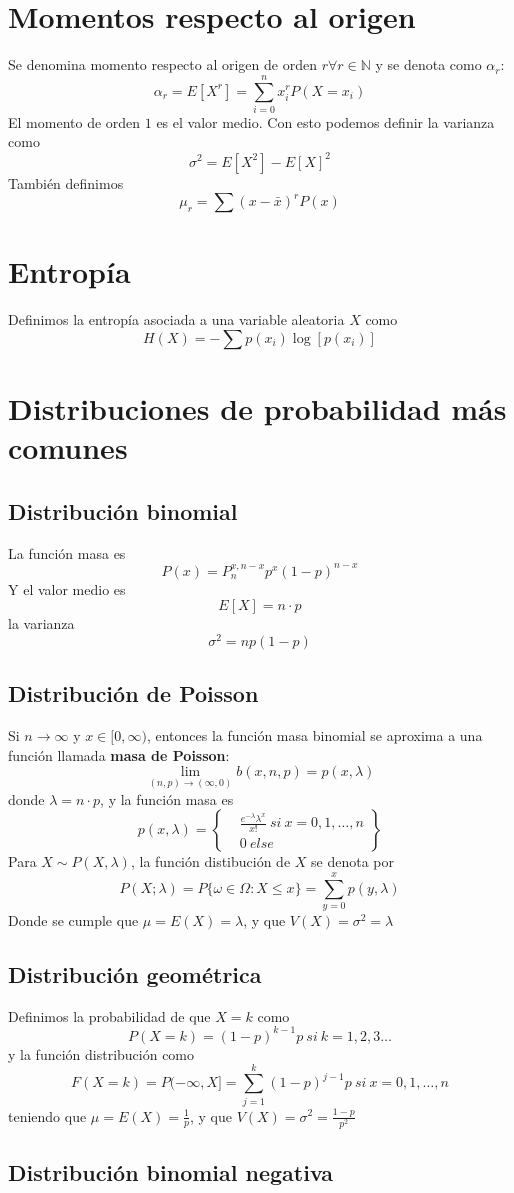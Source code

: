 \documentclass{./Probabilidad.tex}
\begin{document}
\section{Momentos respecto al origen}
Se denomina momento respecto al origen de orden $r \forall r \in \mathbb{N}$ y se denota como $\alpha_{r}$:
$$
\alpha_{r}=E[X^{r}] = \sum_{i=0}^{n} x_{i}^{r}P(X=x_{i})
$$
El momento de orden $1$ es el valor medio. Con esto podemos definir la varianza como
$$
\sigma^{2}=E[X^{2}]-E[X]^{2}
$$
También definimos
$$
\mu_{r} = \sum(x-\bar{x})^rP(x)
$$
\section{Entropía}
Definimos la entropía asociada a una variable aleatoria $X$ como
$$
H(X)= -\sum p(x_{i}) \log[p(x_{i})]
$$
\section{Distribuciones de probabilidad más comunes}
\subsection{Distribución binomial}
La función masa es
\[
	P(x) = P_{n}^{x,n-x}p^{x}(1-p)^{n-x}
\]
Y el valor medio es
\[
	E[X] = n\cdot p
\]
la varianza
\[
	\sigma ^{2}= np(1-p)
\]
\subsection{Distribución de Poisson}
Si $n \to \infty$ y $x \in [0, \infty)$, entonces la función masa binomial se aproxima a una función llamada \textbf{masa de Poisson}:
\[
	\lim_{(n,p) \to (\infty,0)} b(x,n,p)=p(x,\lambda) 
\]
donde $\lambda = n\cdot p$, y la función masa es
\[
	p(x,\lambda) = \left\{
		\begin{matrix}
			&\frac{e^{-\lambda} \lambda^{x}}{x!}~si~x=0,1,\dots ,n\\
			&0~else
	\end{matrix}\right\}
\]
Para $X\sim P(X,\lambda)$, la función distibución de $X$ se denota por
\[
	P(X;\lambda)=P \{ \omega \in \Omega : X \leq x\} = \sum_{y=0}^{x} p(y,\lambda)
\]
Donde se cumple que $\mu = E(X) = \lambda$, y que $V(X) = \sigma ^{2} = \lambda$ 
\subsection{Distribución geométrica}
Definimos la probabilidad de que $X=k$ como
\[
	P(X=k)=(1-p)^{k-1}p~si~k=1,2,3\dots 
\]
y la función distribución como
\[
	F(X=k)=P(-\infty,X]= \sum_{j=1}^{k} (1-p)^{j-1}p~si~x=0,1,\dots ,n
\]
teniendo que $\mu=E(X)=\frac{1}{p}$, y que $V(X)=\sigma ^{2}= \frac{1-p}{p ^{2}}$
\subsection{Distribución binomial negativa}
\end{document}
